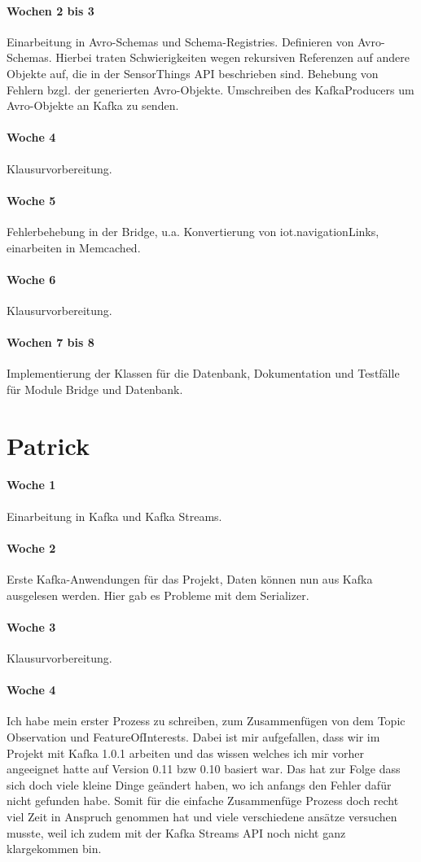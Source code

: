 \paragraph{Wochen 2 bis 3}
Einarbeitung in Avro-Schemas und Schema-Registries. Definieren von Avro-Schemas. Hierbei traten Schwierigkeiten wegen rekursiven Referenzen auf andere Objekte auf, die in der SensorThings API beschrieben sind. Behebung von Fehlern bzgl. der generierten Avro-Objekte. Umschreiben des KafkaProducers um Avro-Objekte an Kafka zu senden.
\paragraph{Woche 4}
Klausurvorbereitung.
\paragraph{Woche 5}
Fehlerbehebung in der Bridge, u.a. Konvertierung von iot.navigationLinks, einarbeiten in Memcached.
\paragraph{Woche 6}
Klausurvorbereitung.
\paragraph{Wochen 7 bis 8}
Implementierung der Klassen für die Datenbank, Dokumentation und Testfälle für Module Bridge und Datenbank.

\newpage
\section{Patrick}
\paragraph{Woche 1}
Einarbeitung in Kafka und Kafka Streams.
\paragraph{Woche 2}
Erste Kafka-Anwendungen für das Projekt, Daten können nun aus Kafka ausgelesen werden. Hier gab es Probleme mit dem Serializer.
\paragraph{Woche 3}
Klausurvorbereitung.
\paragraph{Woche 4}
Ich habe mein erster Prozess zu schreiben, zum Zusammenfügen von dem Topic Observation und FeatureOfInterests. Dabei ist mir aufgefallen, dass wir im Projekt mit Kafka 1.0.1 arbeiten und das wissen welches ich mir vorher angeeignet hatte auf Version 0.11 bzw 0.10 basiert war. Das hat zur Folge dass sich doch viele kleine Dinge geändert haben, wo ich anfangs den Fehler dafür nicht gefunden habe. Somit für die einfache Zusammenfüge Prozess doch recht viel Zeit in Anspruch genommen hat und viele verschiedene ansätze versuchen musste, weil ich zudem mit der Kafka Streams API noch nicht ganz klargekommen bin.
